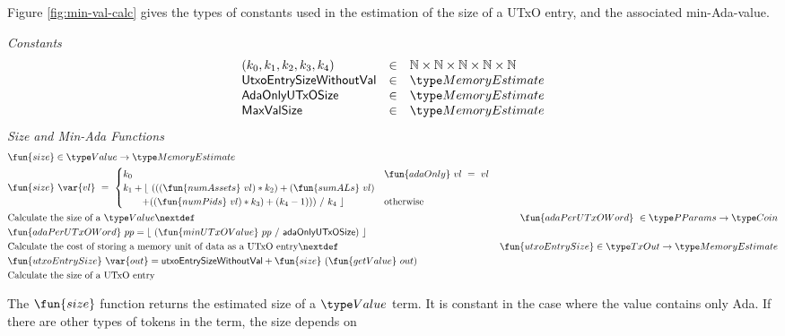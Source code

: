 Figure \ref{fig:min-val-calc} gives the types of constants used in the estimation
of the size of a UTxO entry, and the associated min-Ada-value.

\begin{figure*}[h]
  \emph{Constants}
  \begin{equation*}
    \begin{array}{lcl}
      (k_0, k_1, k_2, k_3, k_4) & \in & \N \times \N \times \N \times \N \times \N \\
      \mathsf{UtxoEntrySizeWithoutVal} & \in & \MemoryEstimate \\
      \mathsf{AdaOnlyUTxOSize} & \in & \MemoryEstimate \\
      \mathsf{MaxValSize} & \in & \MemoryEstimate \\
    \end{array}
  \end{equation*}
  \emph{Size and Min-Ada Functions}
  \begin{align*}
    & \fun{size} \in \Value \to \MemoryEstimate \\
    & \fun{size}~\var{vl} ~=~
    \begin{cases}
      k_0 & \fun{adaOnly}~vl~=~vl \\
      k_1 + \lfloor~ (((\fun{numAssets}~vl) * k_2) + (\fun{sumALs}~vl) & \\
      ~~~~~~ + ((\fun{numPids}~vl) * k_3) + (k_4 - 1)))~ /~ k_4~\rfloor & \text{otherwise} \\
    \end{cases} \\
    & \text{Calculate the size of a $\Value$}
    \nextdef
    & \fun{adaPerUTxOWord}~\in \PParams \to \Coin \\
    & \fun{adaPerUTxOWord}~pp = \lfloor~ (\fun{minUTxOValue}~pp~/~ \mathsf{adaOnlyUTxOSize})~ \rfloor \\
    & \text{Calculate the cost of storing a memory unit of data as a UTxO entry}
    \nextdef
    & \fun{utxoEntrySize} \in \TxOut \to \MemoryEstimate \\
    & \fun{utxoEntrySize}~\var{out} = \mathsf{utxoEntrySizeWithoutVal} + \fun{size}~ (\fun{getValue}~out) \\
    & \text{Calculate the size of a UTxO entry}
\end{align*}
\caption{Value Size}
\label{fig:min-val-calc}
\end{figure*}

The $\fun{size}$ function returns the estimated size of a $\Value$ term. It is constant in the
case where the value contains only Ada. If there are other types of tokens in the
term, the size depends on

